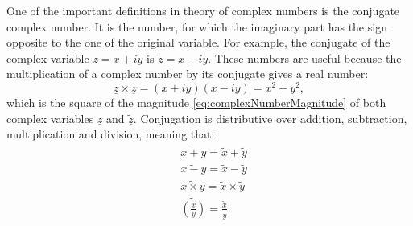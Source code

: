 \documentclass[
]{book}
\begin{document}
One of the important definitions in theory of complex numbers is the conjugate complex number. It is the number, for which the imaginary part has the sign opposite to the one of the original variable. For example, the conjugate of the complex variable \(\underline{z} = x+ iy\) is \(\underline{\tilde{z}} = x- iy\). These numbers are useful because the multiplication of a complex number by its conjugate gives a real number:
\begin{equation}
    \underline{z} \times \underline{\tilde{z}} = (x+ iy) (x- iy) = x^2 + y^2 ,
    \label{eq:complexNumberConjugateMulti}
\end{equation}
which is the square of the magnitude \eqref{eq:complexNumberMagnitude} of both complex variables \(\underline{z}\) and \(\underline{\tilde{z}}\). Conjugation is distributive over addition, subtraction, multiplication and division, meaning that:
\begin{equation}
    \begin{aligned}
        & \widetilde{x + y} = \tilde{x} + \tilde{y} \\
        & \widetilde{x - y} = \tilde{x} - \tilde{y} \\
        & \widetilde{x \times y} = \tilde{x} \times \tilde{y} \\
        & \widetilde{\left(\frac{x}{y}\right)} = \frac{\tilde{x}}{\tilde{y}} .
    \end{aligned}
    \label{eq:complexNumberConjugateDistributive}
\end{equation}
\end{document}
